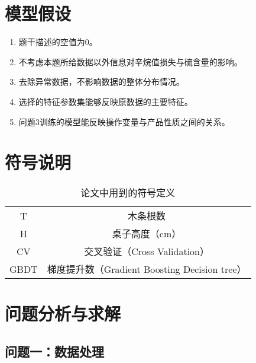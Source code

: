 \documentclass[bwprint]{gmcmthesis}
\begin{document}
\FloatBarrier
\section{模型假设}


\begin{enumerate}[itemindent=20pt]
	\item 题干描述的空值为0。
	\item 不考虑本题所给数据以外信息对辛烷值损失与硫含量的影响。
	\item 去除异常数据，不影响数据的整体分布情况。
	\item 选择的特征参数集能够反映原数据的主要特征。
	\item 问题3训练的模型能反映操作变量与产品性质之间的关系。
\end{enumerate}


\FloatBarrier
\section{符号说明}


\begin{table}[hp]
    \centering
    \caption{论文中用到的符号定义}
	\begin{tabular}{cc}
	\toprule
	 \makebox[0.4\textwidth][c]{符号}	&  \makebox[0.5\textwidth][c]{意义} \\ 
	 \midrule
	 T	    & 木条根数   \\
	 H	    & 桌子高度（cm）  \\
	 \midrule
	 CV	    & 交叉验证（Cross Validation） \\
	 GBDT	& 梯度提升数（Gradient Boosting Decision tree）  \\ 
	 \bottomrule
	\end{tabular}
    \label{tab:addlabel}%
\end{table}%




\FloatBarrier
\section{问题分析与求解}
\FloatBarrier
\subsection{问题一：数据处理}

\end{document}
